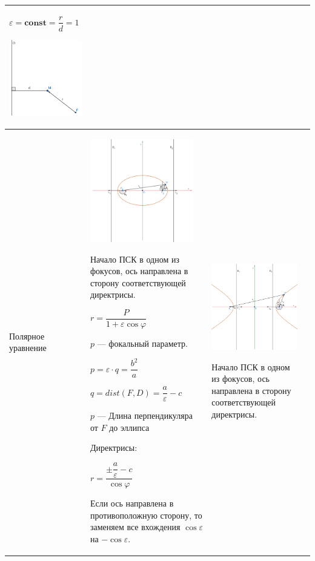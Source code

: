 \documentclass[twoside]{book}
\begin{document}
\begin{center}
\begin{longtable}{|p{2.5cm}|p{4.5cm}|p{4.5cm}|p{4.5cm}|}
        \(\varepsilon = \mathbf{const} = \dfrac{r}{d} = 1\)
        \begin{center}
            \includegraphics[width=4.5cm]{Images/Chapter_1/3-1-2.png}
        \end{center}
        \\
        \hline
        Полярное уравнение
         &
        \begin{center}
            \includegraphics[width=4.5cm]{Images/Chapter_1/3-1-10.png}
        \end{center}
        Начало ПСК в одном из фокусов, ось направлена в сторону соответствующей директрисы.

        \(r = \dfrac{P}{1 + \varepsilon \cos\varphi}\)

        \(p\) --- фокальный параметр.

        \(p = \varepsilon \cdot q = \dfrac{b^2}{a}\)

        \(q = dist(F, D) = \dfrac{a}{\varepsilon} - c\)

        \(p\) --- Длина перпендикуляра от \(F\) до эллипса

        Директрисы:

        \(r = \dfrac{\pm \dfrac{a}{\varepsilon} - c}{\cos\varphi}\)

        Если ось направлена в противоположную сторону, то заменяем все вхождения $\cos{\varepsilon}$ на $-\cos{\varepsilon}$.
         &
        \begin{center}
            \includegraphics[width=4.5cm]{Images/Chapter_1/3-1-11.png}
        \end{center}
        Начало ПСК в одном из фокусов, ось направлена в сторону соответствующей директрисы.


\end{longtable}
\end{center}
\end{document}
